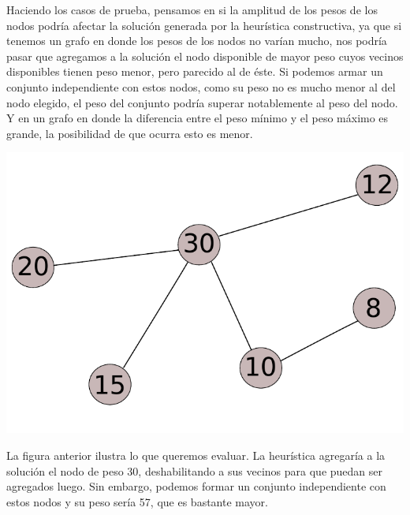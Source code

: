\documentclass[a4paper, 10pt]{article}
\begin{document}


\newpage

Haciendo los casos de prueba, pensamos en si la amplitud de los pesos de los nodos podr\'ia afectar la soluci\'on generada por la heur\'istica constructiva, ya que si tenemos un grafo en donde los pesos de los nodos no var\'ian mucho, nos podr\'ia pasar que agregamos a la soluci\'on el nodo disponible de mayor peso cuyos vecinos disponibles tienen peso menor, pero parecido al de \'este. Si podemos armar un conjunto independiente con estos nodos, como su peso no es mucho menor al del nodo elegido, el peso del conjunto podr\'ia superar notablemente al peso del nodo. Y en un grafo en donde la diferencia entre el peso m\'inimo y el peso m\'aximo es grande, la posibilidad de que ocurra esto es menor. \\

\begin{center}
	\includegraphics[scale=0.50]{Graficos/grafo.pdf}
\end{center}

La figura anterior ilustra lo que queremos evaluar. La heur\'istica agregar\'ia a la soluci\'on el nodo de peso 30, deshabilitando a sus vecinos para que puedan ser agregados luego. Sin embargo, podemos formar un conjunto independiente con estos nodos y su peso ser\'ia 57, que es bastante mayor. \\
\end{document}
